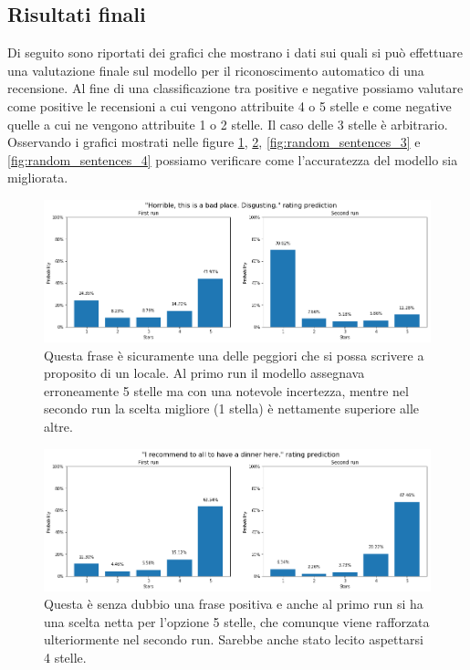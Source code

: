 \documentclass[12pt]{article}
\begin{document}
\subsection{Risultati finali}
Di seguito sono riportati dei grafici che mostrano i dati sui quali si può effettuare una valutazione finale sul modello per il riconoscimento automatico di una recensione. \newline
Al fine di una classificazione tra positive e negative possiamo valutare come positive le recensioni a cui vengono attribuite 4 o 5 stelle e come negative quelle a cui ne vengono attribuite 1 o 2 stelle. Il caso delle 3 stelle è arbitrario.\newline
Osservando i grafici mostrati nelle figure \ref{fig:random_sentences_1}, \ref{fig:random_sentences_2}, \ref{fig:random_sentences_3} e \ref{fig:random_sentences_4} possiamo verificare come l'accuratezza del modello sia migliorata.
\begin{figure}[H]
\centering
\includegraphics[width=\textwidth]{images/sent1.png}
\caption{Questa frase è sicuramente una delle peggiori che si possa scrivere a proposito di un locale. Al primo run il modello assegnava erroneamente 5 stelle ma con una notevole incertezza, mentre nel secondo run la scelta migliore (1 stella) è nettamente superiore alle altre.}
\label{fig:random_sentences_1}
\end{figure}

\begin{figure}[H]
\centering
\includegraphics[width=\textwidth]{images/sent2.png}
\caption{Questa è senza dubbio una frase positiva e anche al primo run si ha una scelta netta per l'opzione 5 stelle, che comunque viene rafforzata ulteriormente nel secondo run. Sarebbe anche stato lecito aspettarsi 4 stelle.}
\label{fig:random_sentences_2}
\end{figure}
\end{document}
